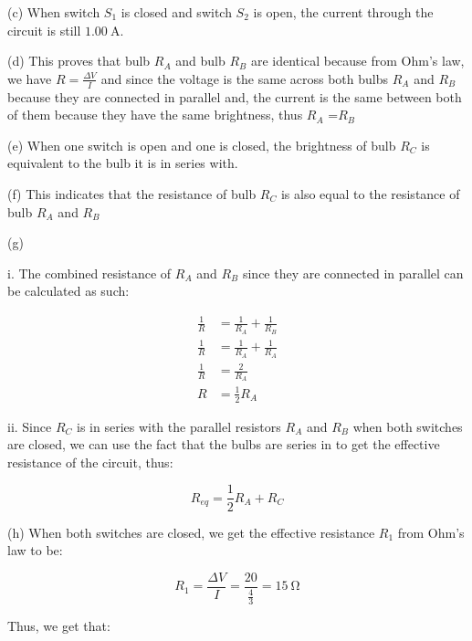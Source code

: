 \documentclass[12pt]{article}
\begin{document}
(c) When switch $S_1$ is closed and switch $S_2$ is open, the current through the circuit is still $\SI{1.00}{\ampere}$.

\bigskip

(d) This proves that bulb $R_A$ and bulb $R_B$ are identical because from Ohm's law, we have $R=\frac{\Delta V}{I}$ and since the voltage is the same across both bulbs $R_A$ and $R_B$ because they are connected in parallel and, the current is the same between both of them because they have the same brightness, thus $R_A$ =$R_B$

\bigskip

(e) When one switch is open and one is closed, the brightness of bulb $R_C$ is equivalent to the bulb it is in series with.

\bigskip

(f) This indicates that the resistance of bulb $R_C$ is also equal to the resistance of bulb $R_A$ and $R_B$

\bigskip

(g)

\bigskip

i. The combined resistance of $R_A$ and $R_B$ since they are connected in parallel can be calculated as such:

\begin{equation*}
    \begin{split}
        \frac{1}{R} & = \frac{1}{R_A} + \frac{1}{R_B} \\
        \frac{1}{R} & = \frac{1}{R_A} + \frac{1}{R_A} \\
        \frac{1}{R} & = \frac{2}{R_A} \\
        R & = \frac{1}{2}R_A
    \end{split}
\end{equation*}

\bigskip

ii. Since $R_C$ is in series with the parallel resistors $R_A$ and $R_B$ when both switches are closed, we can use the fact that the bulbs are series in to get the effective resistance of the circuit, thus:

\[R_{eq} = \frac{1}{2}R_A + R_C \]

\bigskip

(h) When both switches are closed, we get the effective resistance $R_1$ from Ohm's law to be:

\bigskip

\[R_1 = \frac{\Delta V}{I} = \frac{20}{\frac{4}{3}} = \SI{15}{\ohm}\]

Thus, we get that:
\end{document}
